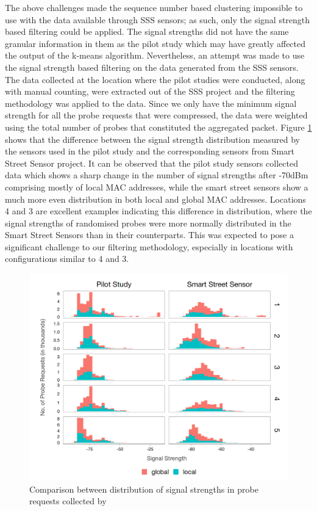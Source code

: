The above challenges made the sequence number based clustering impossible to use with the data available through SSS sensors; as such, only the signal strength based filtering could be applied.
The signal strengths did not have the same granular information in them as the pilot study which may have greatly affected the output of the k-means algorithm.
Nevertheless, an attempt was made to use the signal strength based filtering on the data generated from the SSS sensors.
The data collected at the location where the pilot studies were conducted, along with manual counting, were extracted out of the SSS project and the filtering methodology was applied to the data.
Since we only have the minimum signal strength for all the probe requests that were compressed, the data were weighted using the total number of probes that constituted the aggregated packet.
Figure \ref{figure:processing:sss:signals} shows that the difference between the signal strength distribution measured by the sensors used in the pilot study and the corresponding sensors from Smart Street Sensor project.
It can be observed that the pilot study sensors collected data which shows a sharp change in the number of signal strengths after -70dBm comprising mostly of local MAC addresses, while the smart street sensors show a much more even distribution in both local and global MAC addresses.
Locations 4 and 3 are excellent examples indicating this difference in distribution, where the signal strengths of randomised probes were more normally distributed in the Smart Street Sensors than in their counterparts.
This was expected to pose a significant challenge to our filtering methodology, especially in locations with configurations similar to 4 and 3.

\begin{figure}
  \includegraphics[trim={5 5 5 5}, clip]{images/processing-sss-signalsnew.png}
  \caption{Comparison between distribution of signal strengths in probe requests collected by }
  \label{figure:processing:sss:signals}
\end{figure}

